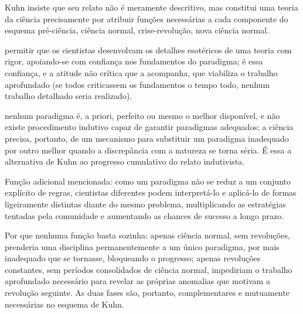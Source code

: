 \documentclass[10pt]{extarticle}
\newcommand{\resposta}[1]{\par\smallskip\noindent #1}
\begin{document}
\begin{questoes}
\resposta{
\begin{topicos}
\item Kuhn insiste que seu relato não é meramente descritivo, mas constitui uma teoria da ciência precisamente por atribuir funções necessárias a cada componente do esquema pré-ciência, ciência normal, crise-revolução, nova ciência normal.
\item[Função da ciência normal:] permitir que os cientistas desenvolvam os detalhes esotéricos de uma teoria com rigor, apoiando-se com confiança nos fundamentos do paradigma; é essa confiança, e a atitude não crítica que a acompanha, que viabiliza o trabalho aprofundado (se todos criticassem os fundamentos o tempo todo, nenhum trabalho detalhado seria realizado).
\item[Função das revoluções:] nenhum paradigma é, a priori, perfeito ou mesmo o melhor disponível, e não existe procedimento indutivo capaz de garantir paradigmas adequados; a ciência precisa, portanto, de um mecanismo para substituir um paradigma inadequado por outro melhor quando a discrepância com a natureza se torna séria. É essa a alternativa de Kuhn ao progresso cumulativo do relato indutivista.
\item Função adicional mencionada: como um paradigma não se reduz a um conjunto explícito de regras, cientistas diferentes podem interpretá-lo e aplicá-lo de formas ligeiramente distintas diante do mesmo problema, multiplicando as estratégias tentadas pela comunidade e aumentando as chances de sucesso a longo prazo.
\item Por que nenhuma função basta sozinha: apenas ciência normal, sem revoluções, prenderia uma disciplina permanentemente a um único paradigma, por mais inadequado que se tornasse, bloqueando o progresso; apenas revoluções constantes, sem períodos consolidados de ciência normal, impediriam o trabalho aprofundado necessário para revelar as próprias anomalias que motivam a revolução seguinte. As duas fases são, portanto, complementares e mutuamente necessárias no esquema de Kuhn.
\end{topicos}
}

\end{questoes}

\end{document}
